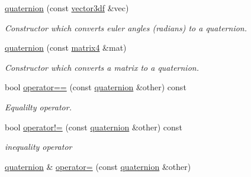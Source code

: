 \begin{DoxyCompactItemize}
\mbox{\label{classirr_1_1core_1_1quaternion_af8d613780a8d0e3f2775f6f9086db3b0}} 
\hyperlink{classirr_1_1core_1_1quaternion_af8d613780a8d0e3f2775f6f9086db3b0}{quaternion} (const \hyperlink{namespaceirr_1_1core_ae6e2b2a6c552833ebbd5b7463d03586b}{vector3df} \&vec)
\begin{DoxyCompactList}\small\item\em Constructor which converts euler angles (radians) to a quaternion. \end{DoxyCompactList}\item 
\mbox{\label{classirr_1_1core_1_1quaternion_a60b4e1a97224c18da64e49861b8d0107}} 
\hyperlink{classirr_1_1core_1_1quaternion_a60b4e1a97224c18da64e49861b8d0107}{quaternion} (const \hyperlink{namespaceirr_1_1core_a4c9d4e29899535971052810954a14431}{matrix4} \&mat)
\begin{DoxyCompactList}\small\item\em Constructor which converts a matrix to a quaternion. \end{DoxyCompactList}\item 
\mbox{\label{classirr_1_1core_1_1quaternion_a73a513d1c05be8c3007bf7f615b92dd4}} 
bool \hyperlink{classirr_1_1core_1_1quaternion_a73a513d1c05be8c3007bf7f615b92dd4}{operator==} (const \hyperlink{classirr_1_1core_1_1quaternion}{quaternion} \&other) const
\begin{DoxyCompactList}\small\item\em Equalilty operator. \end{DoxyCompactList}\item 
\mbox{\label{classirr_1_1core_1_1quaternion_a5438edad0c932d06d6f23651903fed83}} 
bool \hyperlink{classirr_1_1core_1_1quaternion_a5438edad0c932d06d6f23651903fed83}{operator!=} (const \hyperlink{classirr_1_1core_1_1quaternion}{quaternion} \&other) const
\begin{DoxyCompactList}\small\item\em inequality operator \end{DoxyCompactList}\item 
\mbox{\label{classirr_1_1core_1_1quaternion_ac985b164e0b1e3403fdd7352bd9de8c5}} 
\hyperlink{classirr_1_1core_1_1quaternion}{quaternion} \& \hyperlink{classirr_1_1core_1_1quaternion_ac985b164e0b1e3403fdd7352bd9de8c5}{operator=} (const \hyperlink{classirr_1_1core_1_1quaternion}{quaternion} \&other)

\end{DoxyCompactItemize}
